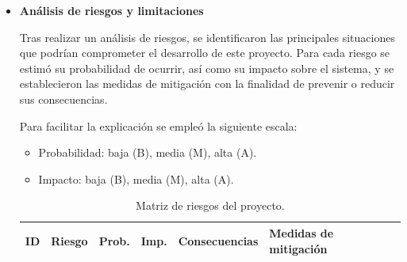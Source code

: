 \begin{itemize}
\begin{itemize}
        \item \textbf{Eficiencia computacional}:
        El entrenamiento de los modelos deberá presentar un coste computacional razonable para los recursos disponibles y los experimentos deberán poder completarse en 
        un tiempo asequible.

        \item \textbf{Trazabilidad}:  
        El sistema deberá permitir guardar y consultar posteriormente los datos obtenidos de las pruebas realizadas, con el fin de comparar y evaluar los 
        distintos modelos ejecutados durante el desarrollo.
        
    \end{itemize}

    \item \textbf{Análisis de riesgos y limitaciones}

    
    Tras realizar un análisis de riesgos, se identificaron las principales situaciones que podrían comprometer el desarrollo de este 
    proyecto. Para cada riesgo se estimó su probabilidad de ocurrir, así como su impacto sobre el sistema, y se establecieron las medidas 
    de mitigación con la finalidad de prevenir o reducir sus consecuencias.

    Para facilitar la explicación se empleó la siguiente escala:

    \begin{itemize}
        \item Probabilidad: baja (B), media (M), alta (A).
        \item Impacto: baja (B), media (M), alta (A).
    \end{itemize}

    \renewcommand{\arraystretch}{1.1}
    \setlength{\tabcolsep}{3pt}
    \small
    \begin{longtable}{>{\raggedright\arraybackslash}p{0.7cm}|
                    >{\raggedright\arraybackslash}p{2.6cm}|
                    >{\centering\arraybackslash}p{0.8cm}|
                    >{\centering\arraybackslash}p{0.8cm}|
                    >{\raggedright\arraybackslash}p{2.8cm}|
                    >{\raggedright\arraybackslash}p{5.0cm}}
    \caption{Matriz de riesgos del proyecto.}
    \label{tab:matriz_riesgos} \\
    
    \rowcolor{udcpink!25}
    \textbf{ID} & \textbf{Riesgo} & \textbf{Prob.} & \textbf{Imp.} & \textbf{Consecuencias} & \textbf{Medidas de mitigación} \\
    \endfirsthead


\end{longtable}
\end{itemize}
